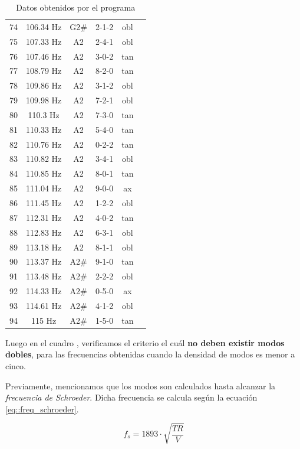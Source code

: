 \begin{table}[H]
\begin{tabular}{|c|c|c|c|c|c|}
74&106.34 Hz&G2\#&2-1-2&obl\\
75&107.33 Hz&A2&2-4-1&obl\\
76&107.46 Hz&A2&3-0-2&tan\\
77&108.79 Hz&A2&8-2-0&tan\\
78&109.86 Hz&A2&3-1-2&obl\\
79&109.98 Hz&A2&7-2-1&obl\\
80&110.3 Hz&A2&7-3-0&tan\\
81&110.33 Hz&A2&5-4-0&tan\\
82&110.76 Hz&A2&0-2-2&tan\\
83&110.82 Hz&A2&3-4-1&obl\\
84&110.85 Hz&A2&8-0-1&tan\\
85&111.04 Hz&A2&9-0-0&ax\\
86&111.45 Hz&A2&1-2-2&obl\\
87&112.31 Hz&A2&4-0-2&tan\\
88&112.83 Hz&A2&6-3-1&obl\\
89&113.18 Hz&A2&8-1-1&obl\\
90&113.37 Hz&A2\#&9-1-0&tan\\
91&113.48 Hz&A2\#&2-2-2&obl\\
92&114.33 Hz&A2\#&0-5-0&ax\\
93&114.61 Hz&A2\#&4-1-2&obl\\
94&115 Hz&A2\#&1-5-0&tan\\
\hline
    \end{tabular}
    \caption{Datos obtenidos por el programa}
    \label{tab:datos_obtenidos_programa}
\end{table}


\newpage

\par Luego en el cuadro , verificamos el criterio el cuál \textbf{no deben existir modos dobles}, para las frecuencias obtenidas cuando la densidad de modos es menor a cinco.\\


\par Previamente, mencionamos que los modos son calculados hasta alcanzar la \textit{frecuencia de Schroeder}. Dicha frecuencia se calcula según la ecuación \eqref{eq::freq_schroeder}.

\begin{equation}
    \boxed{f_s = 1893 \cdot \sqrt{\frac{TR}{V}}}
    \label{eq::freq_schroeder}
\end{equation}

